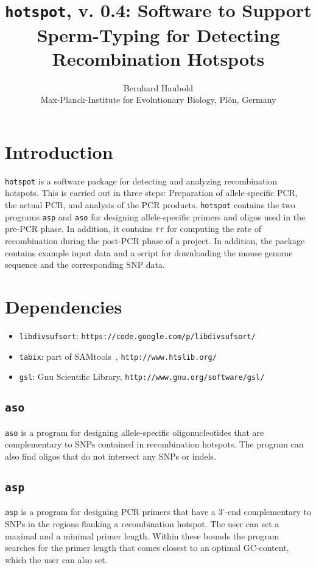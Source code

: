 \documentclass{article}
\newcommand{\bi}{\begin{itemize}}
\newcommand{\ei}{\end{itemize}}
\newcommand{\I}{\item}
\newcommand{\ty}{\texttt}
\newcommand{\version}{0.4}
\begin{document}
\title{\ty{hotspot}, v. \version: Software to Support Sperm-Typing for
Detecting Recombination Hotspots}
\author{Bernhard Haubold\\\small Max-Planck-Institute for Evolutionary Biology, Pl\"on, Germany}
\maketitle
\section{Introduction}
\ty{hotspot} is a software package for detecting and analyzing
recombination hotspots. This is carried out in three steps:
Preparation of allele-specific PCR, the actual PCR, and analysis of
the PCR products. \ty{hotspot} contains the two programs \ty{asp} and \ty{aso} for designing
allele-specific primers and oligos used in the pre-PCR phase. In
addition, it contains \ty{rr} for computing the rate of recombination
during the post-PCR phase of a project. In addition, the package
contains example input data and a script for downloading the mouse
genome sequence and the corresponding SNP data.

\section{Dependencies}
\bi
\I \ty{libdivsufsort}: \ty{https://code.google.com/p/libdivsufsort/}
\I \ty{tabix}: part of SAMtools~\cite{li09:seq},
\ty{http://www.htslib.org/}
\I \ty{gsl}: Gnu Scientific Library, \ty{http://www.gnu.org/software/gsl/}
\ei

\subsection{\ty{aso}}
\ty{aso} is a program for designing allele-specific oligonucleotides that are
complementary to SNPs contained in recombination hotspots. The program
can also find oligos that do not intersect any SNPs or indels. 

\subsection{\ty{asp}}
\ty{asp} is a program for designing PCR primers that have a 3'-end
complementary to SNPs in the regions flanking a recombination
hotspot. The user can set a maximal and a minimal primer
length. Within these bounds the program searches for the primer length
that comes closest to an optimal GC-content, which the user can also
set.
\end{document}
